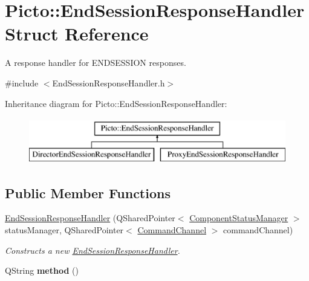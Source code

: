 \hypertarget{struct_picto_1_1_end_session_response_handler}{\section{Picto\-:\-:End\-Session\-Response\-Handler Struct Reference}
\label{struct_picto_1_1_end_session_response_handler}
}


A response handler for E\-N\-D\-S\-E\-S\-S\-I\-O\-N responses.  




{\ttfamily \#include $<$End\-Session\-Response\-Handler.\-h$>$}

Inheritance diagram for Picto\-:\-:End\-Session\-Response\-Handler\-:\begin{figure}[H]
\begin{center}
\leavevmode
\includegraphics[height=2.000000cm]{struct_picto_1_1_end_session_response_handler}
\end{center}
\end{figure}
\subsection*{Public Member Functions}
\begin{DoxyCompactItemize}
\item 
\hyperlink{struct_picto_1_1_end_session_response_handler_a795194cba7e1bfe70b09b890736e8c5e}{End\-Session\-Response\-Handler} (Q\-Shared\-Pointer$<$ \hyperlink{class_component_status_manager}{Component\-Status\-Manager} $>$ status\-Manager, Q\-Shared\-Pointer$<$ \hyperlink{class_picto_1_1_command_channel}{Command\-Channel} $>$ command\-Channel)
\begin{DoxyCompactList}\small\item\em Constructs a new \hyperlink{struct_picto_1_1_end_session_response_handler}{End\-Session\-Response\-Handler}. \end{DoxyCompactList}\item 
\hypertarget{struct_picto_1_1_end_session_response_handler_a424cbbd75ab2ae6d7ec20589ae60f4b6}{Q\-String {\bfseries method} ()}\label{struct_picto_1_1_end_session_response_handler_a424cbbd75ab2ae6d7ec20589ae60f4b6}

\end{DoxyCompactItemize}
